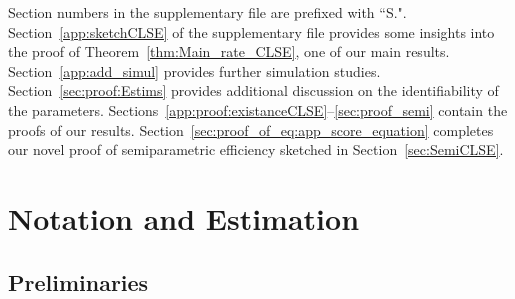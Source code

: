 {Section numbers in the supplementary file are prefixed with ``S.". Section~\ref{app:sketchCLSE} of the supplementary file provides some insights into the proof of Theorem~\ref{thm:Main_rate_CLSE},  one of our main results. 
Section~\ref{app:add_simul} provides further simulation studies. Section~\ref{sec:proof:Estims}  provides additional discussion on the identifiability of the parameters. Sections~\ref{app:proof:existanceCLSE}--\ref{sec:proof_semi} contain the proofs of our results.  Section~\ref{sec:proof_of_eq:app_score_equation}  completes our novel proof of semiparametric efficiency sketched in Section~\ref{sec:SemiCLSE}.}

\section{Notation and Estimation}\label{sec:Estim}
\subsection{Preliminaries} \label{sec:prelim}

